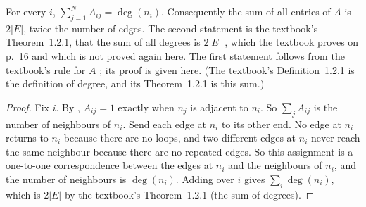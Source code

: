 \begin{theorem}\label{prop:rowsums}
For every $i$, $\sum_{j=1}^{N}A_{ij}=\deg(n_i)$. Consequently the sum of all entries of $A$ is $2|E|$, twice the number of edges. The second statement is the textbook's Theorem~1.2.1, that the sum of all degrees is $2|E|$ \cite[p.~16]{petrosyan2015grafneri}, which the textbook proves on p.~16 and which is not proved again here. The first statement follows from the textbook's rule for $A$ \cite[p.~11]{petrosyan2015grafneri}; its proof is given here. (The textbook's Definition~1.2.1 is the definition of degree, and its Theorem~1.2.1 is this sum.)
\end{theorem}
\begin{proof}
Fix $i$. By , $A_{ij}=1$ exactly when $n_j$ is adjacent to $n_i$. So $\sum_j A_{ij}$ is the number of neighbours of $n_i$. Send each edge at $n_i$ to its other end. No edge at $n_i$ returns to $n_i$ because there are no loops, and two different edges at $n_i$ never reach the same neighbour because there are no repeated edges. So this assignment is a one-to-one correspondence between the edges at $n_i$ and the neighbours of $n_i$, and the number of neighbours is $\deg(n_i)$. Adding over $i$ gives $\sum_i \deg(n_i)$, which is $2|E|$ by the textbook's Theorem~1.2.1 (the sum of degrees).
\end{proof}

